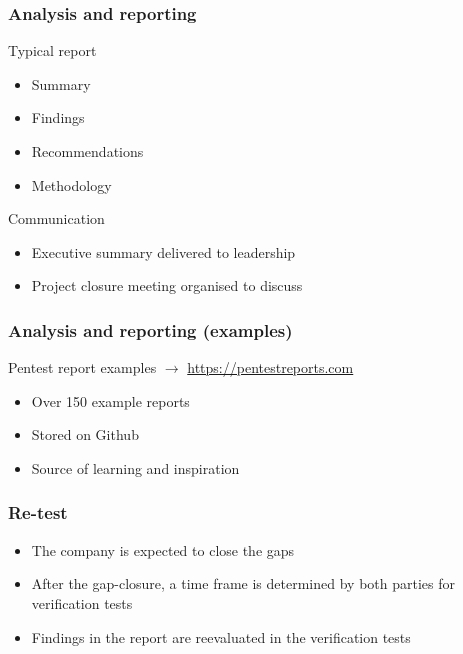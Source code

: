 \begin{frame}
    \frametitle{Analysis and reporting}

    \note[item]{
    }
    
    Typical report
    
	\begin{itemize}
		\item Summary
		\item Findings
		\item Recommendations
		\item Methodology				
	\end{itemize}	    

	Communication	
	\begin{itemize}
		\item Executive summary delivered to leadership
		\item Project closure meeting organised to discuss
	\end{itemize}	    

\end{frame}

\begin{frame}
    \frametitle{Analysis and reporting (examples)}

    \note[item]{
    }

	Pentest report examples $\rightarrow$ \url{https://pentestreports.com}    
	
	\begin{itemize}
		\item Over 150 example reports
		\item Stored on Github
		\item Source of learning and inspiration
	\end{itemize}
\end{frame}

\begin{frame}
    \frametitle{Re-test}

    \note[item]{
    }
    
	\begin{itemize}
		\item The company is expected to close the gaps
		\item After the gap-closure, a time frame is determined by both parties for verification tests
		\item Findings in the report are reevaluated in the verification tests
	\end{itemize}	    
\end{frame}

